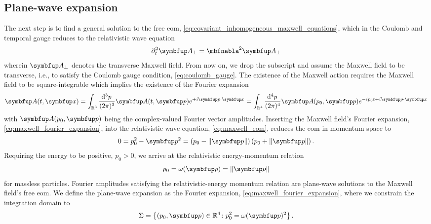 \subsection{Plane-wave expansion}

The next step is to find a general solution to the free \gls{eom}, \cref{eq:covariant_inhomogeneous_maxwell_equations},
which in the Coulomb and temporal gauge reduces to the relativistic wave equation
\begin{equation}
	\partial_t^2
	\vb{A}_\perp
	=
	\laplace
	\vb{A}_\perp
	\label{eq:maxwell_eom}
\end{equation}
wherein $\vb{A}_\perp$ denotes the transverse Maxwell field.
From now on, we drop the subscript and assume the Maxwell field to be transverse, i.e., to satisfy the Coulomb gauge condition, \cref{eq:coulomb_gauge}.
The existence of the Maxwell action requires the Maxwell field to be square-integrable which implies the existence of the Fourier expansion
\begin{equation}
	\vb{A}(t,\vb{x})
	=
	\int_{\mathbb{R}^3}\frac{\dd[3]{p}}{(2\pi)^3}
	\vb{A}(t,\vb{p})
	e^{+i\vb{p}\vdot\vb{x}}
	=
	\int_{\mathbb{R}^4}\frac{\dd[4]{p}}{(2\pi)^4}
	\vb{A}(p_0,\vb{p})
	e^{-ip_0t+i\vb{p}\vdot\vb{x}}
	\label{eq:maxwell_fourier_expansion}
\end{equation}
with $\vb{A}(p_0,\vb{p})$ being the complex-valued Fourier vector amplitudes.
Inserting the Maxwell field's Fourier expansion, \cref{eq:maxwell_fourier_expansion}, into the relativistic wave equation, \cref{eq:maxwell_eom}, reduces the \gls{eom} in momentum space to
\begin{equation}
	0
	=
	p_0^2
	-
	\vb{p}^2
	=
	\left(
		p_0
		-
		\norm{\vb{p}}
	\right)
	\left(
		p_0
		+
		\norm{\vb{p}}
	\right)
	\label{eq:maxwell_eom_momentum}
	.
\end{equation}
Requiring the energy to be positive, $p_0>0$, we arrive at the relativistic energy-momentum relation
\begin{equation}
	p_0
	=
	\omega(\vb{p})
	=
	\norm{\vb{p}}
	\label{eq:energy_momentum_relation}
\end{equation}
for massless particles.
Fourier amplitudes satisfying the relativistic-energy momentum relation are plane-wave solutions to the Maxwell field's free \gls{eom}.
We define the plane-wave expansion as the Fourier expansion, \cref{eq:maxwell_fourier_expansion}, where we constrain the integration domain to
\begin{equation*}
	\Sigma
	=
	\left\{
		\left(p_0,\vb{p}\right)
		\in
		\mathbb{R}^4
		\colon
		p_0^2
		=
		\omega(\vb{p})^2
	\right\}
	.
\end{equation*}
